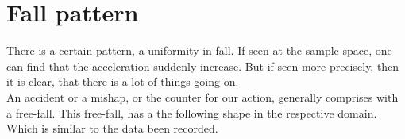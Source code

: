 \section{Fall pattern}
\label{sec:sec03}
There is a certain pattern, a uniformity in fall.
If seen at the sample space, one can find that the acceleration suddenly increase.
But if seen more precisely, then it is clear, that there is a lot of things going on. \\
An accident or a mishap, or the counter for our action, generally comprises with a free-fall.
This free-fall, has a the following shape in the respective domain. Which is similar to the data been recorded.

\begin{figure}[h]


\centering
\begin{minipage}{3.3cm}
    \centering
\end{minipage}
\hspace{0.5cm}
\begin{minipage}{3.3cm}
    \centering
\end{minipage}
\hspace{1.3cm}
\begin{minipage}{3.3cm}
    \centering
\end{minipage}


\end{figure}
